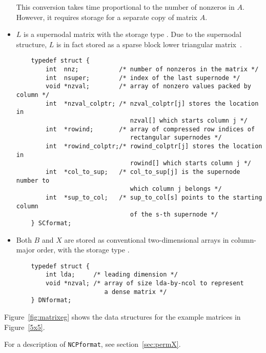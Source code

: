 \begin{itemize}
This conversion takes time proportional to the number of nonzeros in $A$.
However, it requires storage for a separate copy of matrix $A$.

\item
$L$ is a supernodal matrix with the storage type {\SC}.
Due to the supernodal structure, $L$ is in fact stored as a 
sparse block lower triangular matrix~\cite{superlu99}.

\begin{verbatim}
    typedef struct {
        int  nnz;           /* number of nonzeros in the matrix */
        int  nsuper;        /* index of the last supernode */
        void *nzval;        /* array of nonzero values packed by column */
        int  *nzval_colptr; /* nzval_colptr[j] stores the location in
                               nzval[] which starts column j */
        int  *rowind;       /* array of compressed row indices of 
                               rectangular supernodes */
        int  *rowind_colptr;/* rowind_colptr[j] stores the location in
                               rowind[] which starts column j */
        int  *col_to_sup;   /* col_to_sup[j] is the supernode number to 
                               which column j belongs */
        int  *sup_to_col;   /* sup_to_col[s] points to the starting column
                               of the s-th supernode */
    } SCformat;
\end{verbatim}

\item
Both $B$ and $X$ are stored as conventional two-dimensional arrays in
column-major order, with the storage type {\DN}.
\begin{verbatim}
    typedef struct {
        int lda;     /* leading dimension */
        void *nzval; /* array of size lda-by-ncol to represent 
                        a dense matrix */
    } DNformat;
\end{verbatim}
\end{itemize}

Figure~\ref{fig:matrixeg} shows the data structures for the %
example matrices in Figure~\ref{5x5}.

For a description of {\tt NCPformat}, see section~\ref{sec:permX}.





